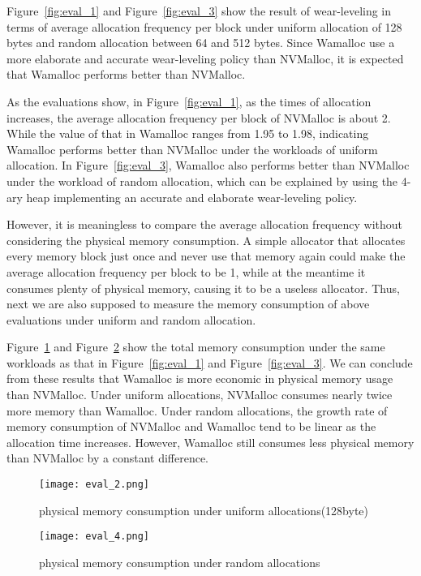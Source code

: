 \documentclass[10pt, conference, compsocconf]{IEEEtran}
\begin{document}
Figure~\ref{fig:eval_1} and Figure~\ref{fig:eval_3} show the result of wear-leveling 
in terms of average allocation frequency per block
under uniform allocation of 128 bytes and random allocation between 64 and 512 bytes.
Since Wamalloc use a more elaborate and accurate wear-leveling policy than NVMalloc,
it is expected that Wamalloc performs better than NVMalloc.

As the evaluations show, in Figure~\ref{fig:eval_1}, as the times of allocation increases,
the average allocation frequency per block of NVMalloc is about 2.
While the value of that in Wamalloc ranges from 1.95 to 1.98, 
indicating Wamalloc performs better than NVMalloc under the workloads of uniform allocation.
In Figure~\ref{fig:eval_3},
Wamalloc also performs better than NVMalloc under the workload of random allocation,
which can be explained by using the 4-ary heap implementing an accurate and elaborate wear-leveling policy.

However, it is meaningless to compare the average allocation frequency without considering the physical memory consumption.
A simple allocator that allocates every memory block just once and never use that memory again 
could make the average allocation frequency per block to be 1, 
while at the meantime it consumes plenty of physical memory, causing it to be a useless allocator.
Thus, next we are also supposed to measure the memory consumption of above evaluations under uniform and random allocation.

Figure~\ref{fig:eval_2} and Figure~\ref{fig:eval_4} show the total memory consumption under the same workloads 
as that in Figure~\ref{fig:eval_1} and Figure~\ref{fig:eval_3}.
We can conclude from these results that 
Wamalloc is more economic in physical memory usage than NVMalloc.
Under uniform allocations, NVMalloc consumes nearly twice more memory than Wamalloc.
Under random allocations, the growth rate of memory consumption of NVMalloc and Wamalloc tend to be linear 
as the allocation time increases. 
However, Wamalloc still consumes less physical memory than NVMalloc by a constant difference.

\begin{figure}[t]
\centering
\texttt{[image: eval\_2.png]}
\caption{physical memory consumption under uniform allocations(128byte)}
\label{fig:eval_2}
\end{figure}

\begin{figure}[t]
\centering
\texttt{[image: eval\_4.png]}
\caption{physical memory consumption under random allocations}
\label{fig:eval_4}
\end{figure}
\end{document}
